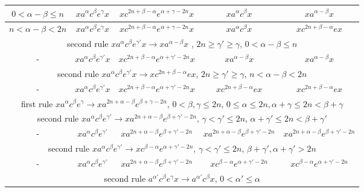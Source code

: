 \documentclass{article}
\theoremstyle{definition}
\begin{document}
\begin{center}
\begin{tabular}{|c|c|c|c|c|}
\hline
$0< \alpha -\beta \le n$&  $ x a^\alpha c^{\beta}  e^{\gamma}  x$ &  $ x c^{2n+\beta - \alpha} e^{\alpha+\gamma-2n}  x$ &  $   x a^\alpha  c^\beta x  $ & $ x a^{\alpha-\beta} x  $\\
\hline
$n< \alpha -\beta < 2n$&  $ x a^\alpha c^{\beta}  e^{\gamma}  x$ &  $ x c^{2n+\beta - \alpha} e^{\alpha+\gamma-2n}  x$ &  $   x a^\alpha  c^\beta x  $ & $ x c^{2n+\beta - \alpha} e x  $\\
\hline
\multicolumn{5}{|c|}{second rule $x a^{\alpha} c^\beta e^{\gamma'} x  \rightarrow x a^{\alpha -\beta}x $ , $2n\ge \gamma' \ge \gamma$,  $0< \alpha -\beta \le n$}\\
\hline
- &  $ x a^\alpha c^{\beta}  e^{\gamma'}  x$ &  $ x c^{2n+\beta - \alpha} e^{\alpha+\gamma'-2n}  x$ &  $   x a^{\alpha-\beta} x  $ & $ x a^{\alpha-\beta} x  $\\
\hline
\multicolumn{5}{|c|}{second rule $x a^{\alpha} c^\beta e^{\gamma'} x  \rightarrow x c^{2n+\beta - \alpha} e  x$, $2n\ge \gamma' \ge \gamma$,  $n< \alpha -\beta < 2n$}\\
\hline
- &  $ x a^\alpha c^{\beta}  e^{\gamma'}  x$ &  $ x c^{2n+\beta - \alpha} e^{\alpha+\gamma'-2n}  x$ &  $   x c^{2n+\beta - \alpha} e x  $ & $ x c^{2n+\beta - \alpha} e x $\\
\hline
\hline
\multicolumn{5}{|c|}{first rule $x a^\alpha c^\beta e^\gamma \rightarrow x a^{2n+\alpha - \beta} e^{\beta+\gamma-2n}$, $0< \beta,\gamma  \le 2n$, $0\le \alpha \le 2n, \alpha+\gamma \le 2n <\beta+\gamma$}\\
\hline
\hline
\multicolumn{5}{|c|}{second rule $x a^\alpha c^\beta e^{\gamma'} \rightarrow x a^{2n+\alpha - \beta} e^{\beta+\gamma'-2n}$, $\gamma<\gamma'  \le 2n$, $\alpha+\gamma' \le 2n <\beta+\gamma'$}\\
\hline
- & $  x a^\alpha c^\beta e^{\gamma'}$ & $x a^{2n+\alpha - \beta} e^{\beta+\gamma'-2n}$ & $x a^{2n+\alpha - \beta} e^{\beta+\gamma'-2n}$ & $x a^{2n+\alpha - \beta} e^{\beta+\gamma'-2n}$ \\
\hline
\multicolumn{5}{|c|}{second rule $x a^\alpha c^\beta e^{\gamma'} \rightarrow x c^{\beta-\alpha} e^{\alpha+\gamma'-2n}$, $\gamma<\gamma'\le2n$, $\beta+\gamma',\alpha+\gamma' > 2n$}\\
\hline
- & $  x a^\alpha c^\beta e^{\gamma'}$ & $x a^{2n+\alpha - \beta} e^{\beta+\gamma'-2n}$ & $x c^{\beta-\alpha} e^{\alpha+\gamma'-2n}$ & $x c^{\beta-\alpha} e^{\alpha+\gamma'-2n}$ \\
\hline
\multicolumn{5}{|c|}{second rule $a^{\alpha'} c^\beta e^\gamma x  \rightarrow a^{\alpha'} c^\beta x $, $0<\alpha' \le \alpha$}\\

\end{tabular}
\end{center}
\end{document}
